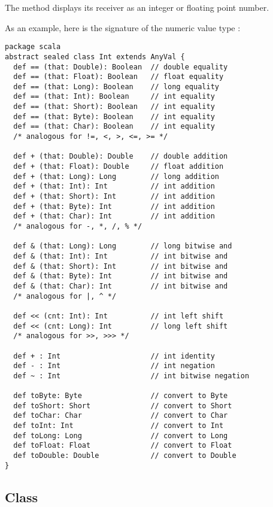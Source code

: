 {{{The  method displays its receiver as an integer or
floating point number.

\example As an example, here is the signature of the numeric value type :

\begin{lstlisting}
package scala 
abstract sealed class Int extends AnyVal {
  def == (that: Double): Boolean  // double equality
  def == (that: Float): Boolean   // float equality
  def == (that: Long): Boolean    // long equality
  def == (that: Int): Boolean     // int equality
  def == (that: Short): Boolean   // int equality
  def == (that: Byte): Boolean    // int equality
  def == (that: Char): Boolean    // int equality
  /* analogous for !=, <, >, <=, >= */

  def + (that: Double): Double    // double addition
  def + (that: Float): Double     // float addition
  def + (that: Long): Long        // long addition
  def + (that: Int): Int          // int addition
  def + (that: Short): Int        // int addition
  def + (that: Byte): Int         // int addition
  def + (that: Char): Int         // int addition
  /* analogous for -, *, /, % */
  
  def & (that: Long): Long        // long bitwise and
  def & (that: Int): Int          // int bitwise and
  def & (that: Short): Int        // int bitwise and
  def & (that: Byte): Int         // int bitwise and
  def & (that: Char): Int         // int bitwise and
  /* analogous for |, ^ */

  def << (cnt: Int): Int          // int left shift
  def << (cnt: Long): Int         // long left shift
  /* analogous for >>, >>> */

  def + : Int                     // int identity
  def - : Int                     // int negation
  def ~ : Int                     // int bitwise negation

  def toByte: Byte                // convert to Byte
  def toShort: Short              // convert to Short
  def toChar: Char                // convert to Char
  def toInt: Int                  // convert to Int
  def toLong: Long                // convert to Long
  def toFloat: Float              // convert to Float
  def toDouble: Double            // convert to Double
}
\end{lstlisting}

\subsection{Class \large{}}
\label{sec:cls-boolean}

}}}
